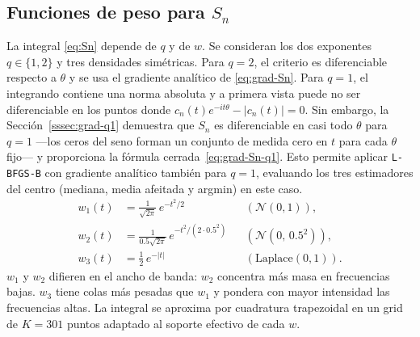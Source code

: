 \newpage
\subsection{Funciones de peso para $S_n$}

La integral \eqref{eq:Sn} depende de $q$ y de $w$. Se consideran los dos exponentes $q\in\{1,2\}$ y tres densidades simétricas. Para $q=2$, el criterio es diferenciable respecto a $\theta$ y se usa el gradiente analítico de \eqref{eq:grad-Sn}. Para $q=1$, el integrando contiene una norma absoluta y a primera vista puede no ser diferenciable en los puntos donde \(c_n(t)e^{-it\theta}-|c_n(t)|=0\).
Sin embargo, la Sección~\ref{sssec:grad-q1} demuestra que $S_n$ es diferenciable en casi todo $\theta$ para $q=1$ —los ceros del seno forman un conjunto de medida cero en $t$ para cada $\theta$ fijo— y proporciona la fórmula cerrada~\eqref{eq:grad-Sn-q1}. Esto permite aplicar \texttt{L-BFGS-B} con gradiente analítico también para $q=1$, evaluando los tres estimadores del centro (mediana, media afeitada y argmin) en este caso.
\begin{align*}
  w_1(t) &= \frac{1}{\sqrt{2\pi}}\,e^{-t^2/2} & &(\mathcal{N}(0,1)),\\
  w_2(t) &= \frac{1}{0.5\sqrt{2\pi}}\,e^{-t^2/(2\cdot 0.5^2)} & &(\mathcal{N}(0,\,0.5^2)),\\
  w_3(t) &= \tfrac{1}{2}\,e^{-|t|} & &(\mathrm{Laplace}(0,1)).
\end{align*}
$w_1$ y $w_2$ difieren en el ancho de banda: $w_2$ concentra más masa en frecuencias bajas. $w_3$ tiene colas más pesadas que $w_1$ y pondera con mayor intensidad las frecuencias altas. La integral se aproxima por cuadratura trapezoidal en un grid de $K=301$ puntos adaptado al soporte efectivo de cada $w$.
